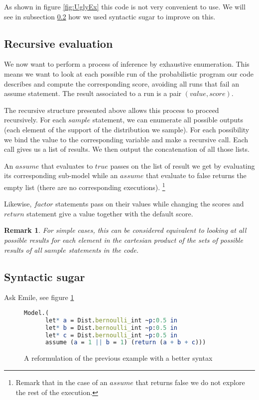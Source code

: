 \documentclass{article}
\newcommand\SC[1]{{\color{violet}{\it \bf Simon :} #1}}
\newtheorem{remark}{Remark}
\begin{document}
	As shown in figure \ref{fig:UglyEx} this code is not very convenient to use. We will see in subsection \ref{subseq:sugar} how we used syntactic sugar to improve on this.

	\subsection{Recursive evaluation}

	We now want to perform a process of inference by exhaustive enumeration.
	This means we want to look at each possible run of the probabilistic program our code describes and compute the corresponding score, avoiding all runs that fail an assume statement.
	The result associated to a run is a pair $(value, score)$.

	The recursive structure presented above allows this process to proceed recursively.
	For each $sample$ statement, we can enumerate all possible outputs (each element of the support of the distribution we sample). For each possibility we bind the value to the corresponding variable and make a recursive call.
	Each call gives us a list of results. We then output the concatenation of all those lists.

	An $assume$ that evaluates to $true$ passes on the list of result we get by evaluating its corresponding sub-model while an $assume$ that evaluate to false returns the empty list (there are no corresponding executions).
	\footnote{Remark that in the case of an $assume$ that returns false we do not explore the rest of the execution.}

	Likewise, $factor$ statements pass on their values while changing the scores and $return$ statement give a value together with the default score.

	\begin{remark}
	  For simple cases, this can be considered equivalent to looking at all possible results for each element in the cartesian product of the sets of possible results of all $sample$ statements in the code.
	\end{remark}

	\subsection{Syntactic sugar}
	\label{subseq:sugar}

	\SC{Ask Emile, see figure \ref{fig:sugar}}

	\begin{figure}[h]
	  \centering
	\begin{lstlisting}[language=Mathematica,frame=single]
    Model.(
      let* a = Dist.bernoulli_int ~p:0.5 in
      let* b = Dist.bernoulli_int ~p:0.5 in
      let* c = Dist.bernoulli_int ~p:0.5 in
      assume (a = 1 || b = 1) (return (a + b + c)))
	\end{lstlisting}
	\caption{A reformulation of the previous example with a better syntax}
	  \label{fig:sugar}
	\end{figure}
\end{document}

